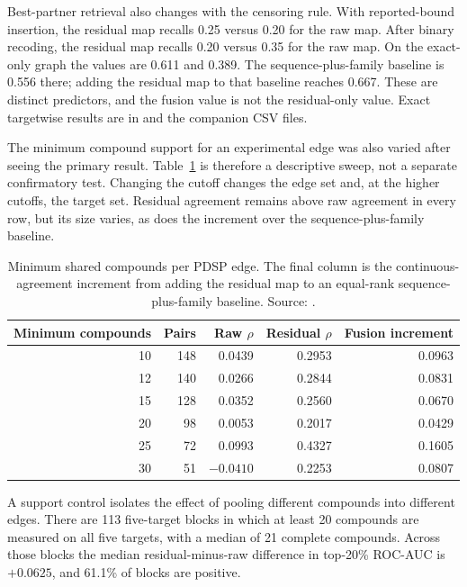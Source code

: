 Best-partner retrieval also changes with the censoring rule. With reported-bound insertion, the
residual map recalls 0.25 versus 0.20 for the raw map. After binary recoding, the residual map
recalls 0.20 versus 0.35 for the raw map. On the exact-only graph the values are 0.611 and 0.389.
The sequence-plus-family baseline is 0.556 there; adding the residual map to that baseline reaches
0.667. These are distinct predictors, and the fusion value is not the residual-only value. Exact
targetwise results are in
 and the companion CSV files.

The minimum compound support for an experimental edge was also varied after seeing the primary
result. Table~\ref{tab:s6-pdsp-support} is therefore a descriptive sweep, not a separate
confirmatory test. Changing the cutoff changes the edge set and, at the higher cutoffs, the target
set. Residual agreement remains above raw agreement in every row, but its size varies, as does the
increment over the sequence-plus-family baseline.

\begin{table}[htbp]
\centering
\small
\setlength{\tabcolsep}{6pt}
\caption[Minimum pair-support sensitivity on PDSP]{Minimum shared compounds per PDSP edge.
The final column is the continuous-agreement increment from adding the residual map to an
equal-rank sequence-plus-family baseline. Source:
.}
\label{tab:s6-pdsp-support}
\begin{tabular}{rrrrr}
\toprule
Minimum compounds & Pairs & Raw $\rho$ & Residual $\rho$ & Fusion increment \\
\midrule
10 & 148 &  0.0439 & 0.2953 & 0.0963 \\
12 & 140 &  0.0266 & 0.2844 & 0.0831 \\
15 & 128 &  0.0352 & 0.2560 & 0.0670 \\
20 &  98 &  0.0053 & 0.2017 & 0.0429 \\
25 &  72 &  0.0993 & 0.4327 & 0.1605 \\
30 &  51 & $-0.0410$ & 0.2253 & 0.0807 \\
\bottomrule
\end{tabular}
\end{table}

A support control isolates the effect of pooling different compounds into different edges. There
are 113 five-target blocks in which at least 20 compounds are measured on all five targets, with
a median of 21 complete compounds. Across those blocks the median residual-minus-raw difference
in top-20\% ROC-AUC is $+0.0625$, and 61.1\% of blocks are positive.

